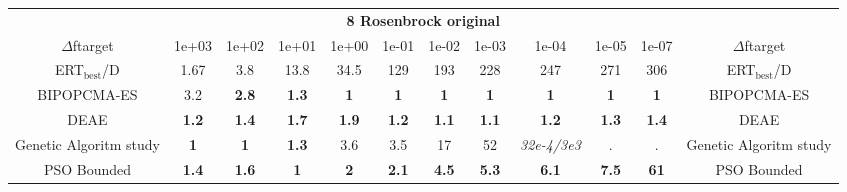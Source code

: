 \begin{tabular}{cccccccccccc}
 & \multicolumn{10}{c}{{\normalsize \textbf{8 Rosenbrock original}}}\\
$\Delta$ftarget& 1e+03& 1e+02& 1e+01& 1e+00& 1e-01& 1e-02& 1e-03& 1e-04& 1e-05& 1e-07 & $\Delta$ftarget \\
ERT$_{\textrm{best}}$/D& 1.67& 3.8& 13.8& 34.5& 129& 193& 228& 247& 271& 306 & ERT$_{\textrm{best}}$/D \\
\hline
BIPOPCMA-ES & 3.2 & \textbf{2.8} & \textbf{1.3} & \textbf{1} & \textbf{1} & \textbf{1} & \textbf{1} & \textbf{1} & \textbf{1} & \textbf{1} & BIPOPCMA-ES \cite{add_an_entry_for_BIPOPCMA-ES_in_bbob.bib}\\
DEAE & \textbf{1.2} & \textbf{1.4} & \textbf{1.7} & \textbf{1.9} & \textbf{1.2} & \textbf{1.1} & \textbf{1.1} & \textbf{1.2} & \textbf{1.3} & \textbf{1.4} & DEAE \cite{add_an_entry_for_DEAE_in_bbob.bib}\\
Genetic Algoritm study & \textbf{1} & \textbf{1} & \textbf{1.3} & 3.6 & 3.5 & 17 & 52 & \textit{32e-4}\textit{/3e3} & . & . & Genetic Algoritm study \cite{add_an_entry_for_Genetic Algoritm study_in_bbob.bib}\\
PSO Bounded & \textbf{1.4} & \textbf{1.6} & \textbf{1} & \textbf{2} & \textbf{2.1} & \textbf{4.5} & \textbf{5.3} & \textbf{6.1} & \textbf{7.5} & \textbf{61} & PSO Bounded \cite{add_an_entry_for_PSO Bounded_in_bbob.bib}
\end{tabular}
